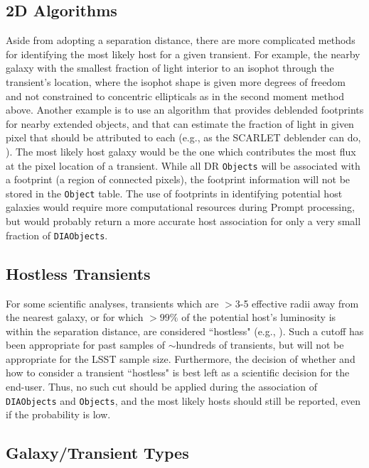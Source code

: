 \documentclass[DM,lsstdraft,authoryear,toc]{lsstdoc}
\begin{document}
\subsection{2D Algorithms}

Aside from adopting a separation distance, there are more complicated methods for identifying the most likely host for a given transient.
For example, the nearby galaxy with the smallest fraction of light interior to an isophot through the transient's location, where the isophot shape is given more degrees of freedom and not constrained to concentric ellipticals as in the second moment method above.
Another example is to use an algorithm that provides deblended footprints for nearby extended objects, and that can estimate the fraction of light in given pixel that should be attributed to each (e.g., as the SCARLET deblender can do, \cite{2018A&C....24..129M}).
The most likely host galaxy would be the one which contributes the most flux at the pixel location of a transient.
While all DR {\tt Objects} will be associated with a footprint (a region of connected pixels), the footprint information will not be stored in the {\tt Object} table.
The use of footprints in identifying potential host galaxies would require more computational resources during Prompt processing, but would probably return a more accurate host association for only a very small fraction of {\tt DIAObjects}. 

\subsection{Hostless Transients}

For some scientific analyses, transients which are $>$3-5 effective radii away from the nearest galaxy, or for which $>99\%$ of the potential host's luminosity is within the separation distance, are considered ``hostless" (e.g., \citealt{2011ApJ...729..142S}).
Such a cutoff has been appropriate for past samples of $\sim$hundreds of transients, but will not be appropriate for the LSST sample size.
Furthermore, the decision of whether and how to consider a transient ``hostless" is best left as a scientific decision for the end-user.
Thus, no such cut should be applied during the association of {\tt DIAObjects} and {\tt Objects}, and the most likely hosts should still be reported, even if the probability is low.

\subsection{Galaxy/Transient Types}
\end{document}
